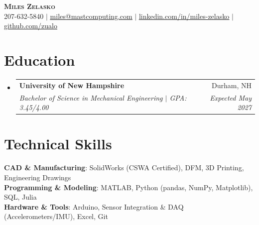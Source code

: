 \documentclass[letterpaper,11pt]{article}
\makeatletter
\newcommand{\resumeSubheading}[4]{
  \vspace{-2pt}\item
    \begin{tabular*}{0.97\textwidth}[t]{l@{\extracolsep{\fill}}r}
      \textbf{#1} & #2 \\
      \textit{\small#3} & \textit{\small #4} \\
    \end{tabular*}\vspace{-7pt}
}
\newcommand{\resumeSubHeadingListStart}{\begin{itemize}[leftmargin=0.15in, label={}]}
\newcommand{\resumeSubHeadingListEnd}{\end{itemize}}
\makeatother
\begin{document}

\begin{center}
    \textbf{\Huge \scshape Miles Zelasko} \\ \vspace{1pt}
    \small 207-632-5840 $|$ \href{mailto:miles@mastcomputing.com}{\underline{miles@mastcomputing.com}} $|$ 
    \href{https://linkedin.com/in/miles-zelasko}{\underline{linkedin.com/in/miles-zelasko}} $|$
    \href{https://github.com/zualo}{\underline{github.com/zualo}}
\end{center}

\section{Education}
  \resumeSubHeadingListStart
    \resumeSubheading
      {University of New Hampshire}{Durham, NH}
      {Bachelor of Science in Mechanical Engineering $|$ GPA: 3.45/4.00}{Expected May 2027}
  \resumeSubHeadingListEnd

\section{Technical Skills}
 \begin{itemize}[leftmargin=0.15in, label={}]
    \small{\item{
     \textbf{CAD \& Manufacturing}{: SolidWorks (CSWA Certified), DFM, 3D Printing, Engineering Drawings} \\
     \textbf{Programming \& Modeling}{: MATLAB, Python (pandas, NumPy, Matplotlib), SQL, Julia} \\
     \textbf{Hardware \& Tools}{: Arduino, Sensor Integration \& DAQ (Accelerometers/IMU), Excel, Git}
    }}
 \end{itemize}

\end{document}
